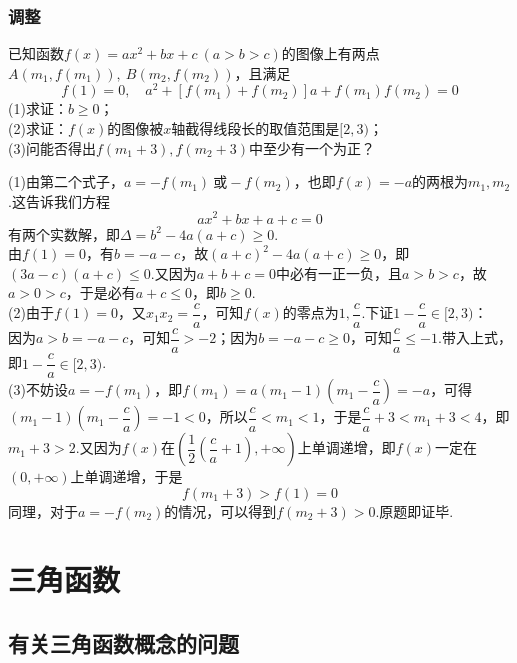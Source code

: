 \documentclass[cn,hazy,black,10pt,normal]{elegantnote}
\newcommand{\ssb}[1]{\left( #1 \right)}
\begin{document}
\subsection{调整}



\begin{problem} %
	已知函数$f(x)=ax^2+bx+c~(a>b>c)$的图像上有两点$A(m_1,f(m_1)),~B(m_2,f(m_2))$，且满足$$f(1)=0,\quad a^2+[f(m_1)+f(m_2)]a+f(m_1)f(m_2)=0$$
	(1)求证：$b\geq 0$； \\
	(2)求证：$f(x)$的图像被$x$轴截得线段长的取值范围是$[2,3)$； \\
	(3)问能否得出$f(m_1+3),f(m_2+3)$中至少有一个为正？
\end{problem}
\begin{solution}
	(1)由第二个式子，$a=-f(m_1)~\textit{或}-f(m_2)$，也即$f(x)=-a$的两根为$m_1,m_2$.这告诉我们方程$$ax^2+bx+a+c=0$$有两个实数解，即$\Delta = b^2-4a(a+c) \geq 0$. \\
	由$f(1)=0$，有$b=-a-c$，故$(a+c)^2-4a(a+c) \geq 0$，即$(3a-c)(a+c) \leq 0$.又因为$a+b+c=0$中必有一正一负，且$a>b>c$，故$a>0>c$，于是必有$a+c \leq 0$，即$b \geq 0$. \\
	(2)由于$f(1)=0$，又$x_1x_2=\dfrac{c}{a}$，可知$f(x)$的零点为$1,\dfrac{c}{a}$.下证$1-\dfrac{c}{a} \in [2,3)$：\\
	因为$a>b=-a-c$，可知$\dfrac{c}{a} > -2$；因为$b=-a-c \geq 0$，可知$\dfrac{c}{a} \leq -1$.带入上式，即$1-\dfrac{c}{a} \in [2,3)$. \\
	(3)不妨设$a=-f(m_1)$，即$f(m_1) = a(m_1-1)(m_1-\dfrac{c}{a}) = -a$，可得$(m_1-1)(m_1-\dfrac{c}{a}) = -1 <0$，所以$\dfrac{c}{a} < m_1 < 1$，于是$\dfrac{c}{a}+3<m_1+3<4$，即$m_1+3>2$.又因为$f(x)$在$\ssb{\dfrac{1}{2}\ssb{\dfrac{c}{a}+1},+\infty}$上单调递增，即$f(x)$一定在$(0,+\infty)$上单调递增，于是$$f(m_1+3) > f(1) = 0$$
	同理，对于$a=-f(m_2)$的情况，可以得到$f(m_2+3)>0$.原题即证毕.
\end{solution}

\chapter{三角函数}

\section{有关三角函数概念的问题}
\end{document}
